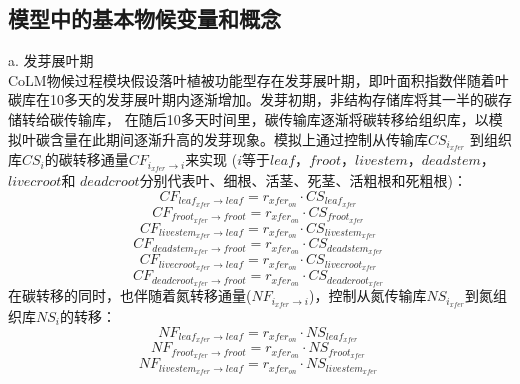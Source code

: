 \subsection{模型中的基本物候变量和概念}\label{模型中的基本物候变量和概念}
a.	发芽展叶期\\
CoLM物候过程模块假设落叶植被功能型存在发芽展叶期，即叶面积指数伴随着叶碳库在10多天的发芽展叶期内逐渐增加。发芽初期，非结构存储库将其一半的碳存储转给碳传输库，
在随后10多天时间里，碳传输库逐渐将碳转移给组织库，以模拟叶碳含量在此期间逐渐升高的发芽现象。模拟上通过控制从传输库$CS_{i_{xfer}}$
到组织库$CS_i$的碳转移通量$CF_{i_{xfer}\rightarrow i}$来实现
($i$等于$leaf$，$froot$，$livestem$，$deadstem$，$livecroot$和
$deadcroot$分别代表叶、细根、活茎、死茎、活粗根和死粗根)：
\begin{equation}
  CF_{leaf_{xfer}\rightarrow leaf}=r_{{xfer}_{on}}\cdot CS_{leaf_{xfer}}\ 
\end{equation}
\begin{equation}
  CF_{froot_{xfer}\rightarrow froot}=r_{{xfer}_{on}}\cdot CS_{froot_{xfer}}\ 
\end{equation}
\begin{equation}
  CF_{livestem_{xfer}\rightarrow leaf}=r_{{xfer}_{on}}\cdot CS_{livestem_{xfer}}\ 
\end{equation}
\begin{equation}
  CF_{deadstem_{xfer}\rightarrow froot}=r_{{xfer}_{on}}\cdot CS_{deadstem_{xfer}}\ 
\end{equation}
\begin{equation}
  CF_{livecroot_{xfer}\rightarrow leaf}=r_{{xfer}_{on}}\cdot CS_{livecroot_{xfer}}\ 
\end{equation}
\begin{equation}
  CF_{deadcroot_{xfer}\rightarrow froot}=r_{{xfer}_{on}}\cdot CS_{deadcroot_{xfer}}\ 
\end{equation}
在碳转移的同时，也伴随着氮转移通量($NF_{i_{xfer}\rightarrow i}$)，控制从氮传输库$NS_{i_{xfer}}$到氮组织库$NS_{i}$的转移：
\begin{equation}
  NF_{leaf_{xfer}\rightarrow leaf}=r_{{xfer}_{on}}\cdot NS_{leaf_{xfer}}\ 
\end{equation}
\begin{equation}
  NF_{froot_{xfer}\rightarrow froot}=r_{{xfer}_{on}}\cdot NS_{froot_{xfer}}\ 
\end{equation}
\begin{equation}
  NF_{livestem_{xfer}\rightarrow leaf}=r_{{xfer}_{on}}\cdot NS_{livestem_{xfer}}\ 
\end{equation}
